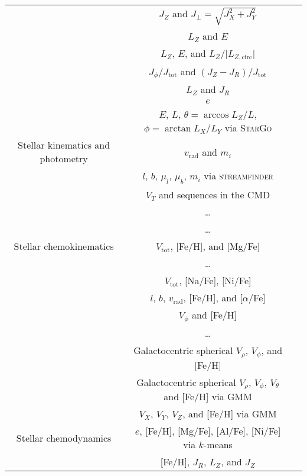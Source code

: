 \begin{table*}
\begin{tabular}{c|c|c}
        & $J_Z$ and $J_\perp = \sqrt{J_X^2 + J_Y^2}$ & \citet{Helmi1999} \\
        & $L_Z$ and $E$ & \citet{Helmi2017, Helmi2018} \\
        & $L_Z$, $E$, and $L_Z/\vert L_{Z,\text{circ}} \vert$ & \citet{Koppelman2019} \\
        & $J_\phi / J_\text{tot}$ and $(J_Z - J_R) / J_\text{tot}$ & \citet{Myeong2019} \\
        & $L_Z$ and $J_R$ & \citet{Feuillet2020} \\
        & $e$ & \citet{Naidu2020} \\
        & $E$, $L$, $\theta = \arccos{L_Z/L}$, $\phi = \arctan{L_X/L_Y}$ via \textsc{StarGo} & \citet{Yuan2020} \\
        \hline
        Stellar kinematics and photometry & $v_\text{rad}$ and $m_i$ & \citet{Ibata1994} \\
        & $l$, $b$, $\mu_l$, $\mu_b$, $m_i$ via \textsc{streamfinder} & \citet{Malhan2018} \\
        & $V_T$ and sequences in the CMD & \citet{Babusiaux2018} \\
        & \dots & \citet{Haywood2018b} \\
        & \dots & \citet{Gallart2019} \\
        \hline
        Stellar chemokinematics & $V_\text{tot}$, [Fe/H], and [Mg/Fe] & \citet{Nissen2010} \\
        & \dots & \citet{Navarro2011} \\
        & $V_\text{tot}$, [Na/Fe], [Ni/Fe] & \citet{Bensby2014} \\
        & $l$, $b$, $v_\text{rad}$, [Fe/H], and [$\alpha$/Fe] & \citet{Hawkins2015} \\
        & $V_\phi$ and [Fe/H] & \citet{Belokurov2020} \\
        & \dots & \citet{An2021b} \\
        & Galactocentric spherical $V_\rho$, $V_\phi$, and [Fe/H] & \citet{Belokurov2018} \\
        & Galactocentric spherical $V_\rho$, $V_\phi$, $V_\theta$ and [Fe/H] via GMM & \citet{Myeong2018c} \\
        & $V_X$, $V_Y$, $V_Z$, and [Fe/H] via GMM & \citep{Nikakhtar2021} \\
        \hline
        Stellar chemodynamics & $e$, [Fe/H], [Mg/Fe], [Al/Fe], [Ni/Fe] via $k$-means & \citet{Mackereth2019} \\
        & [Fe/H], $J_R$, $L_Z$, and $J_Z$ & \citet{Myeong2018b} \\

\end{tabular}
\end{table*}
